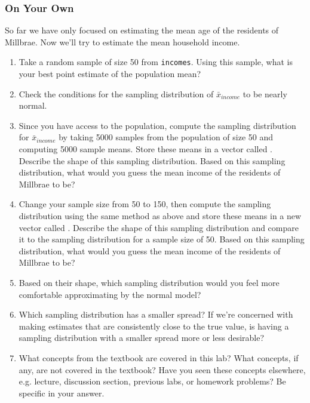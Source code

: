 \documentclass[11pt]{article}
\begin{document}
\subsubsection*{On Your Own}
So far we have only focused on estimating the mean age of the residents of Millbrae.  Now we'll try to estimate the mean household income.
\begin{enumerate}
\item Take a random sample of size 50 from \texttt{incomes}. Using this sample, what is your best point estimate of the population mean?
\item Check the conditions for the sampling distribution of $\bar{x}_{income}$ to be nearly normal.
\item Since you have access to the population, compute the sampling distribution for $\bar{x}_{income}$ by taking 5000 samples from the population of size 50 and computing 5000 sample means.  Store these means in a vector called . Describe the shape of this sampling distribution. Based on this sampling distribution, what would you guess the mean income of the residents of Millbrae to be?
\item Change your sample size from 50 to 150, then compute the sampling distribution using the same method as above and store these means in a new vector called . Describe the shape of this sampling distribution and compare it to the sampling distribution for a sample size of 50.  Based on this sampling distribution, what would you guess the mean income of the residents of Millbrae to be?
\item Based on their shape, which sampling distribution would you feel more comfortable approximating by the normal model?
\item Which sampling distribution has a smaller spread?  If we're concerned with making estimates that are consistently close to the true value, is having a sampling distribution with a smaller spread more or less desirable?
\item What concepts from the textbook are covered in this lab?  What concepts, if any, are not covered in the textbook?  Have you seen these concepts elsewhere, e.g. lecture, discussion section, previous labs, or homework problems?  Be specific in your answer.

\end{enumerate}
\end{document}
